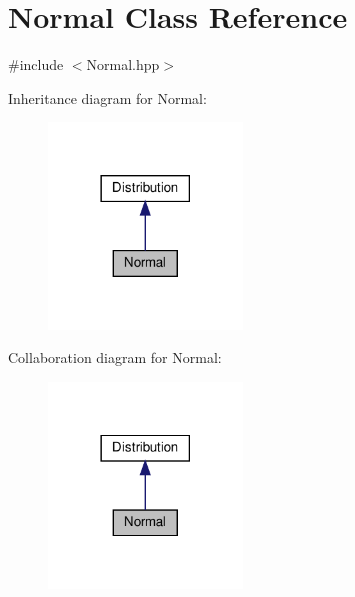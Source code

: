 \hypertarget{classNormal}{}\section{Normal Class Reference}
\label{classNormal}


{\ttfamily \#include $<$Normal.\+hpp$>$}



Inheritance diagram for Normal\+:
\nopagebreak
\begin{figure}[H]
\begin{center}
\leavevmode
\includegraphics[width=146pt]{classNormal__inherit__graph}
\end{center}
\end{figure}


Collaboration diagram for Normal\+:
\nopagebreak
\begin{figure}[H]
\begin{center}
\leavevmode
\includegraphics[width=146pt]{classNormal__coll__graph}
\end{center}
\end{figure}
